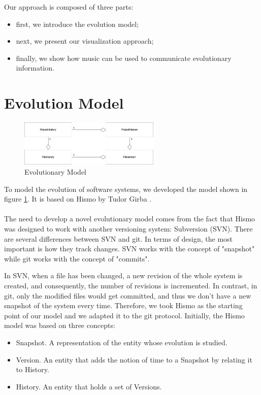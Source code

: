 Our approach is composed of three parts: 
\begin{itemize}
    \item first, we introduce the evolution model; 
    \item next, we present our visualization approach;
    \item finally, we show how music can be used to communicate evolutionary information. 
\end{itemize}


\section{Evolution Model}
\label{s:EvolutionModel}

\begin{figure}[H]
    \begin{center}
        \includegraphics[width=0.6\textwidth]{EvolutionModel.jpg}
    \end{center}
    \caption{Evolutionary Model}
    \label{fig:EvolutionaryModel}
\end{figure}

To model the evolution of software systems, we developed the model 
shown in figure \ref{fig:EvolutionaryModel}. It is based on Hismo by Tudor Girba \cite{Girba2005}.\\
\\
The need to develop a novel evolutionary model comes from the fact that Hismo was designed to work with another versioning system: Subversion (SVN). 
There are several differences between SVN and git. In terms of design, the most important is how they track changes. 
SVN works with the concept of "snapshot" while git works with the concept of "commits".


In SVN, when a file has been changed, a new revision of the whole system is created, and consequently, the number of revisions is incremented. 
In contrast, in git, only the modified files would get committed, and thus we don't have a new snapshot of the system every time. 
Therefore, we took Hismo as the starting point of our model and we adapted it to the git protocol. 
Initially, the Hismo model was based on three concepts:
\begin{itemize}
    \item Snapshot. A representation of the entity whose evolution is studied.
    \item Version. An entity that adds the notion of time to a Snapshot by relating it to History. 
    \item History. An entity that holds a set of Versions.
\end{itemize}


